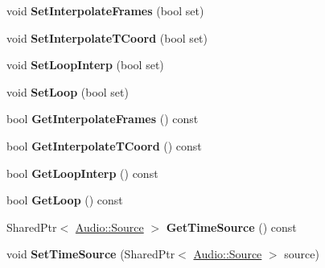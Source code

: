 \begin{DoxyCompactItemize}
\item 
void {\bfseries Set\+Interpolate\+Frames} (bool set)\hypertarget{classAnimatedTexture_ab79712f21eefa3a16e4cb81fca8db83b}{}\label{classAnimatedTexture_ab79712f21eefa3a16e4cb81fca8db83b}

\item 
void {\bfseries Set\+Interpolate\+T\+Coord} (bool set)\hypertarget{classAnimatedTexture_a2f6bca7fc8c6fa33031b1ba7d23804f5}{}\label{classAnimatedTexture_a2f6bca7fc8c6fa33031b1ba7d23804f5}

\item 
void {\bfseries Set\+Loop\+Interp} (bool set)\hypertarget{classAnimatedTexture_aa7262cafdcbaa01452760636f639a138}{}\label{classAnimatedTexture_aa7262cafdcbaa01452760636f639a138}

\item 
void {\bfseries Set\+Loop} (bool set)\hypertarget{classAnimatedTexture_a2892f58a12b381441c639e02b04f19e2}{}\label{classAnimatedTexture_a2892f58a12b381441c639e02b04f19e2}

\item 
bool {\bfseries Get\+Interpolate\+Frames} () const \hypertarget{classAnimatedTexture_ae10388214c77fb483a28d954d69430eb}{}\label{classAnimatedTexture_ae10388214c77fb483a28d954d69430eb}

\item 
bool {\bfseries Get\+Interpolate\+T\+Coord} () const \hypertarget{classAnimatedTexture_a5c0f8bc1f34a0716684f85ec3674a472}{}\label{classAnimatedTexture_a5c0f8bc1f34a0716684f85ec3674a472}

\item 
bool {\bfseries Get\+Loop\+Interp} () const \hypertarget{classAnimatedTexture_a606a524fc362770aa09cdd2be1d0685b}{}\label{classAnimatedTexture_a606a524fc362770aa09cdd2be1d0685b}

\item 
bool {\bfseries Get\+Loop} () const \hypertarget{classAnimatedTexture_a9e3856afd613935e7a29a66d78dc5dad}{}\label{classAnimatedTexture_a9e3856afd613935e7a29a66d78dc5dad}

\item 
Shared\+Ptr$<$ \hyperlink{classAudio_1_1Source}{Audio\+::\+Source} $>$ {\bfseries Get\+Time\+Source} () const \hypertarget{classAnimatedTexture_ac76ac7a07d3e61d1370c9571e6773414}{}\label{classAnimatedTexture_ac76ac7a07d3e61d1370c9571e6773414}

\item 
void {\bfseries Set\+Time\+Source} (Shared\+Ptr$<$ \hyperlink{classAudio_1_1Source}{Audio\+::\+Source} $>$ source)\hypertarget{classAnimatedTexture_a08c64b9ea089718b357d1b33b79aa3ca}{}\label{classAnimatedTexture_a08c64b9ea089718b357d1b33b79aa3ca}


\end{DoxyCompactItemize}
